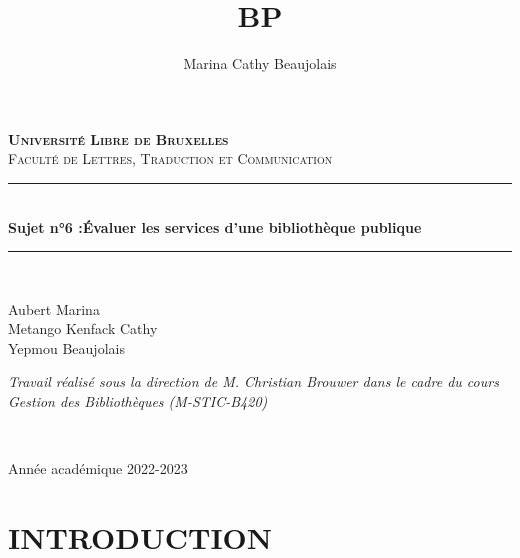 \documentclass[french,a4paper,12pt]{article}
\title{BP} %
\author{Marina Cathy Beaujolais}
\newcommand{\HRule}{\rule{\linewidth}{0.5mm}}
\begin{document}
\begin{titlepage}
  \begin{sffamily}
  \begin{center}
    

    \textsc{\bfseries \LARGE Université Libre de Bruxelles }\\[0.5cm]
    \textsc{\Large Faculté de Lettres, Traduction et Communication}\\[6cm]

    \HRule \\[0.4cm]
    { \huge \bfseries Sujet n°6 :​Évaluer les services​ d’une bibliothèque publique\\[0.4cm] }

    \HRule \\[4cm]
    \begin{minipage}{0.4\textwidth}
      \begin{flushleft} \large
        Aubert Marina \\
        Metango Kenfack Cathy \\
        Yepmou Beaujolais \\
        
      \end{flushleft}
    \end{minipage}
    \begin{minipage}{0.4\textwidth}
      \begin{flushright} \large
        \emph{Travail réalisé sous la direction de M. Christian Brouwer dans le cadre du cours Gestion des Bibliothèques (M-STIC-B420)} 
      \end{flushright}
    \end{minipage} \\ [2cm]

    \vfill

    {\large {} Année académique 2022-2023}

  \end{center}
  \end{sffamily}
\end{titlepage}


 \begin{center}
 \tableofcontents
 \end{center}
\newpage



\section{INTRODUCTION}
\end{document}
